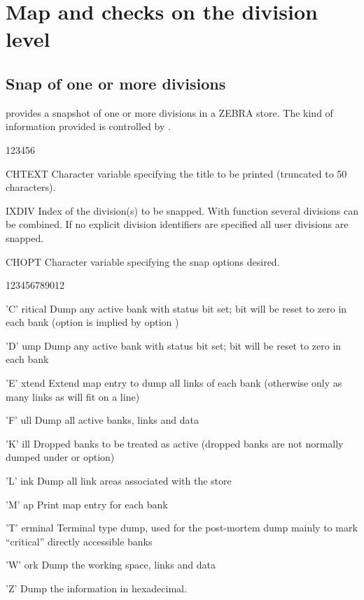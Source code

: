 \newpage

\section{Map and checks on the division level}
\subsection{Snap of one or more divisions}
\label{sec:DZSNAP}


\Action
{} provides a snapshot of one or more divisions in a ZEBRA
store. The kind of information provided is controlled by .

\begin{DLtt}{123456}
\item[CHTEXT] Character variable specifying the title to be printed
      (truncated to 50 characters).
\item[IXDIV]  Index of the division(s) to be snapped.
      With function  several divisions can be combined.
      If no explicit division identifiers are specified
      all user divisions are snapped.
\item[CHOPT]Character variable specifying the snap options desired.
\begin{DLttc}{123456789012}
\item['C' ritical]Dump any active bank with status bit  set;
bit  will be reset to zero in each bank
(option  is implied by option )
\item['D' ump]Dump any active bank with status bit  set;
bit  will be reset to zero in each bank
\item['E' xtend]Extend map entry to dump all links of each bank
(otherwise only as many links as will fit on a line)
\item['F' ull]Dump all active banks, links and data
\item['K' ill]Dropped banks to be treated as active
(dropped banks are not normally dumped under  or  option)
\item['L' ink]Dump all link areas associated with the store
\item['M' ap]Print map entry for each bank
\item['T' erminal]Terminal type dump, used for the post-mortem dump
mainly to mark ``critical'' directly accessible banks
\item['W' ork]Dump the working space, links and data
\item['Z']Dump the information in hexadecimal.
\end{DLttc}
\end{DLtt}

